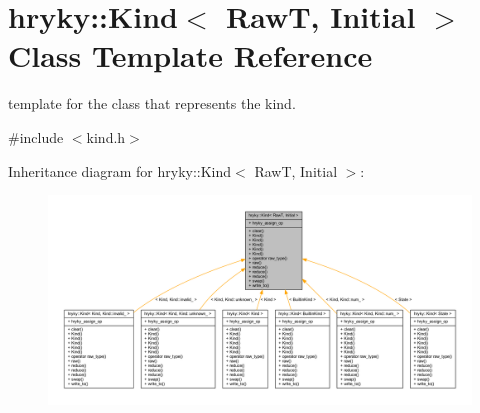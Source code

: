 \hypertarget{classhryky_1_1_kind}{\section{hryky\-:\-:Kind$<$ Raw\-T, Initial $>$ Class Template Reference}
\label{classhryky_1_1_kind}
}


template for the class that represents the kind.  




{\ttfamily \#include $<$kind.\-h$>$}



Inheritance diagram for hryky\-:\-:Kind$<$ Raw\-T, Initial $>$\-:
\nopagebreak
\begin{figure}[H]
\begin{center}
\leavevmode
\includegraphics[width=350pt]{classhryky_1_1_kind__inherit__graph}
\end{center}
\end{figure}
